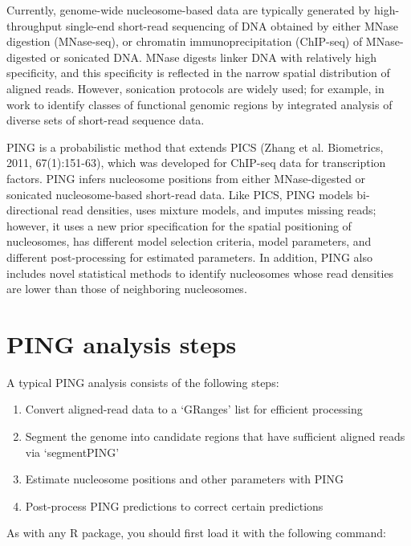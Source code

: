 \documentclass[11pt]{article}
\begin{document}
Currently, genome-wide nucleosome-based data are typically generated by high-throughput single-end short-read sequencing of DNA obtained by either MNase digestion (MNase-seq), or chromatin immunoprecipitation (ChIP-seq) of MNase-digested or sonicated DNA. MNase digests linker DNA with relatively high specificity, %
and this specificity is reflected in the narrow spatial distribution of aligned reads. However, sonication protocols are widely used;  for example, in work to identify classes of functional genomic regions by integrated analysis of diverse sets of short-read sequence data. %

PING is a probabilistic method that extends PICS (Zhang et al. Biometrics, 2011, 67(1):151-63), which was developed for ChIP-seq data for transcription factors. PING infers nucleosome positions from either MNase-digested or sonicated nucleosome-based short-read data. Like PICS, PING models bi-directional read densities, uses mixture models, and imputes missing reads; however, it uses a new prior specification for the spatial positioning of nucleosomes, has different model selection criteria, model parameters, and different post-processing for estimated parameters. In addition, PING also includes novel statistical methods to identify nucleosomes whose read densities are lower than those of neighboring nucleosomes. 

\section{PING analysis steps}
A typical PING analysis consists of the following steps:
\begin{enumerate}
  \item Convert aligned-read data to a `GRanges' list for efficient processing
  \item Segment the genome into candidate regions that have sufficient aligned reads via `segmentPING'
  \item Estimate nucleosome positions and other parameters with PING
  \item Post-process PING predictions to correct certain predictions
\end{enumerate}

As with any R package, you should first load it with the following command:
\end{document}
